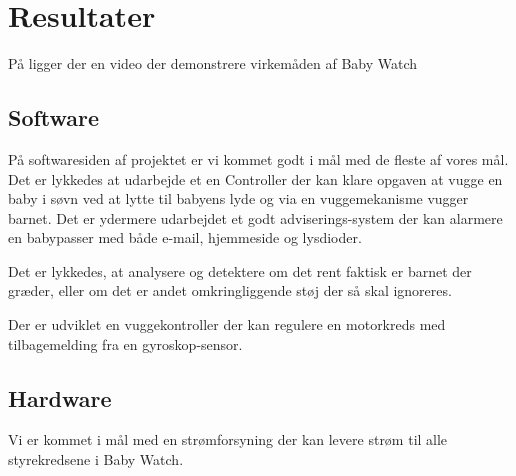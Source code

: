 \chapter{Resultater}

På \citep{cd} ligger der en video der demonstrere virkemåden af Baby Watch

\section{Software}

På softwaresiden af projektet er vi kommet godt i mål med de fleste af vores mål. Det er lykkedes at udarbejde et en Controller der kan klare opgaven at vugge en baby i søvn ved at lytte til babyens lyde og via en vuggemekanisme vugger barnet. Det er ydermere udarbejdet et godt adviserings-system der kan alarmere en babypasser med både e-mail, hjemmeside og lysdioder.

Det er lykkedes, at analysere og detektere om det rent faktisk er barnet der græder, eller om det er andet omkringliggende støj der så skal ignoreres.

Der er udviklet en vuggekontroller der kan regulere en motorkreds med tilbagemelding fra en gyroskop-sensor.

\section{Hardware}

Vi er kommet i mål med en strømforsyning der kan levere strøm til alle styrekredsene i Baby Watch.